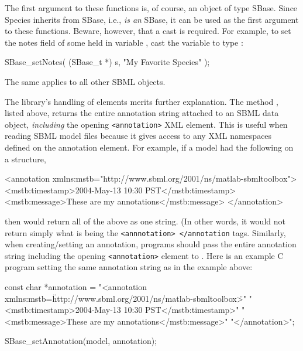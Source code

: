 \documentclass{sbmlmanual}
\begin{document}
The first argument to these functions is, of course, an object of type
SBase.  Since Species inherits from SBase, i.e., 
\emph{is an} SBase, it can be used as the first argument to these
functions.  Beware, however, that a cast is required.  For example, to set
the notes field of some  held in variable , cast
the variable to type :

\begin{example}[c]
  SBase_setNotes( (SBase_t *) s, "My Favorite Species" );
\end{example}

The same applies to all other SBML objects.

The \libsbml{} library's handling of  elements merits
further explanation.  The method , listed
above, returns the entire annotation string attached to an SBML data
object, \emph{including} the opening \texttt{<annotation>} XML element.
This is useful when reading SBML model files because it gives access to any
XML namespaces defined on the annotation element.  For example, if a model
had the following on a structure,

\begin{example}[html]
  <annotation xmlns:mstb="http://www.sbml.org/2001/ns/matlab-sbmltoolbox">
    <mstb:timestamp>2004-May-13 10:30 PST</mstb:timestamp>
    <mstb:message>These are my annotations</mstb:message>
  </annotation>
\end{example}

then  would return all of the above as one
string.  (In other words, it would not return simply what is being the
\texttt{<annnotation> </annotation} tags.  Similarly, when creating/setting
an annotation, programs should pass the entire annotation string including
the opening \texttt{<annotation>} element to
.  Here is an example C program setting the
same annotation string as in the example above:

\begin{example}[c]
  const char *annotation =
      "<annotation xmlns:mstb=\"http://www.sbml.org/2001/ns/matlab-sbmltoolbox\">"
      "  <mstb:timestamp>2004-May-13 10:30 PST</mstb:timestamp>\n"
      "  <mstb:message>These are my annotations</mstb:message>\n"
      "</annotation>";
  
  SBase_setAnnotation(model, annotation);
\end{example}
\end{document}

